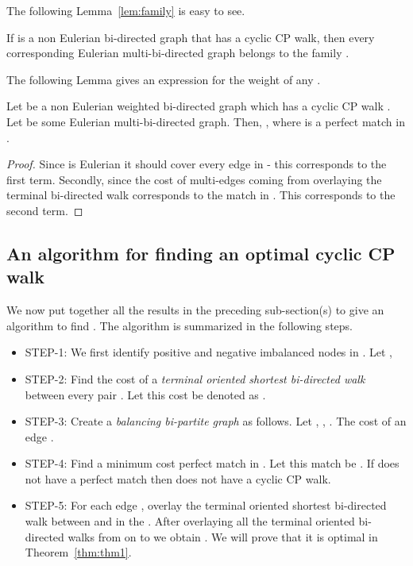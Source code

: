 \documentclass[runningheads]{llncs}
\begin{document}
The following Lemma~\ref{lem:family} is easy to see.
\begin{lemma}
\label{lem:family}
If  is a non Eulerian bi-directed graph that has a cyclic CP walk, then every corresponding
Eulerian multi-bi-directed graph  belongs to the family .
\end{lemma}

The following Lemma gives an expression for the weight of
any .
\begin{lemma}
\label{lem:weight}
Let  be a non Eulerian weighted bi-directed graph which has a cyclic CP walk .
Let  be some Eulerian multi-bi-directed graph. Then, 
, where 
 is a perfect match in .
\end{lemma}
\begin{proof}
Since  is Eulerian it should cover every edge in  - this corresponds to the first term. Secondly,
since  the cost of multi-edges coming from overlaying the terminal bi-directed
walk corresponds to the match  in . This corresponds to the second term. 
\end{proof}

\subsection{An algorithm for finding an optimal cyclic CP walk}
We now put together all the results in the preceding sub-section(s) to give an algorithm to find .
The algorithm is summarized in the following steps.

\begin{itemize}
\item {\sf STEP-1:} We first identify positive and negative imbalanced nodes in . 
Let , 
\item {\sf STEP-2:} Find the cost of a {\em terminal oriented shortest bi-directed walk} between every pair 
. Let this cost be denoted as .
\item {\sf STEP-3:} Create a {\em balancing bi-partite graph}  as follows. Let , , . The cost of an edge . 
\item {\sf STEP-4:} Find a minimum cost perfect match in . Let this match be . If  does not have a
perfect match then  does not have a cyclic CP walk.
\item {\sf STEP-5:} For each edge  , overlay the terminal oriented shortest bi-directed
walk between  and  in the . After overlaying all the terminal oriented bi-directed walks from  on to 
 we obtain . We will prove that it is optimal in Theorem~\ref{thm:thm1}.
\end{itemize}
\end{document}
